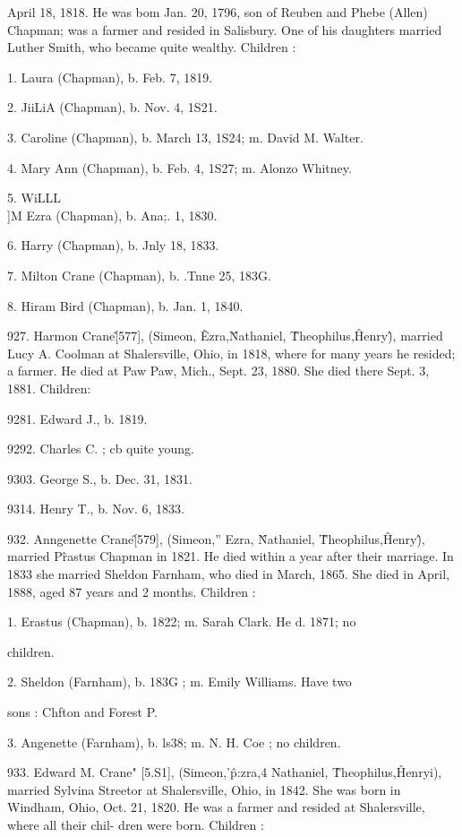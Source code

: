 \documentclass{book}
\begin{document}
April 18, 1818. He was bom Jan. 20, 1796, son of Reuben and 
Phebe (Allen) Chapman; was a farmer and resided in Salisbury. 
One of his daughters married Luther Smith, who became quite 
wealthy. Children : 

1. Laura (Chapman), b. Feb. 7, 1819. 

2. JiiLiA (Chapman), b. Nov. 4, 1S21. 

3. Caroline (Chapman), b. March 13, 1S24; m. David M. Walter. 

4. Mary Ann (Chapman), b. Feb. 4, 1S27; m. Alonzo Whitney. 

5. WiLLL\\]M Ezra (Chapman), b. Ana;. 1, 1830. 

6. Harry (Chapman), b. Jnly 18, 1833. 

7. Milton Crane (Chapman), b. .Tnne 25, 183G. 

8. Hiram Bird (Chapman), b. Jan. 1, 1840. 

927. Harmon Crane\^ [577], (Simeon, \^ Ezra,\^ Nathaniel, \^ 
Theophilus,\^ Henry\^), married Lucy A. Coolman at Shalersville, 
Ohio, in 1818, where for many years he resided; a farmer. He 
died at Paw Paw, Mich., Sept. 23, 1880. She died there Sept. 
3, 1881. Children: 

9281. Edward J., b. 1819. 

9292. Charles C. ; cb quite young. 

9303. George S., b. Dec. 31, 1831. 

9314. Henry T., b. Nov. 6, 1833. 

932. Anngenette Crane\^ [579], (Simeon,'' Ezra, \^ Nathaniel, \^ 
Theophilus,\^ Henry\^), married P\^rastus Chapman in 1821. He 
died within a year after their marriage. In 1833 she married 
Sheldon Farnham, who died in March, 1865. She died in April, 
1888, aged 87 years and 2 months. Children : 

1. Erastus (Chapman), b. 1822; m. Sarah Clark. He d. 1871; no 

children. 

2. Sheldon (Farnham), b. 183G ; m. Emily Williams. Have two 

sons : Chfton and Forest P. 

3. Angenette (Farnham), b. ls38; m. N. H. Coe ; no children. 

933. Edward M. Crane" [5.S1], (Simeon,'\^ p:zra,4 Nathaniel, \^ 
Theophilus,\^ Henryi), married Sylvina Streetor at Shalersville, 
Ohio, in 1842. She was born in Windham, Ohio, Oct. 21, 1820. 
He was a farmer and resided at Shalersville, where all their chil- 
dren were born. Children : 
\end{document}

